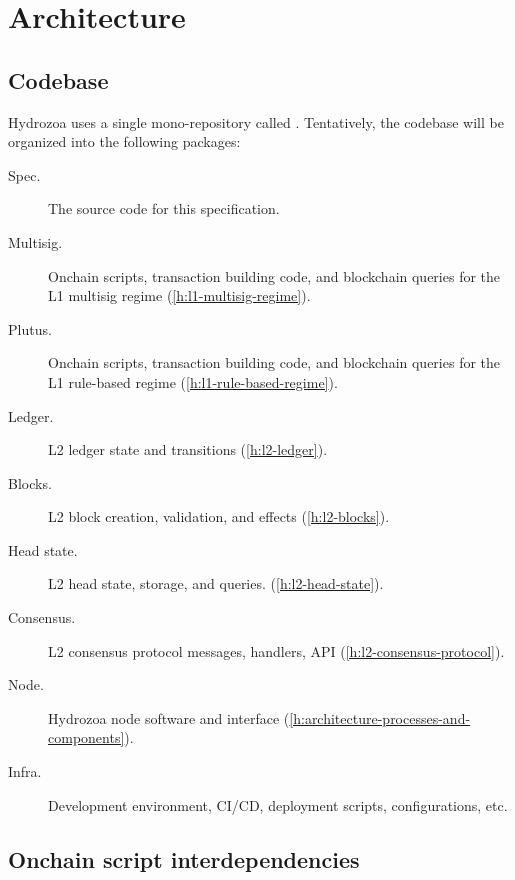 \documentclass[../hydrozoa.tex]{subfiles}
\begin{document}
\chapter{Architecture}%
\label{h:architecture}%


\section{Codebase}%
\label{h:architecture-codebase}%

Hydrozoa uses a single mono-repository called  \citep{FlerovskyRodionovHydrozoaRepositoryGithub2025}.
Tentatively, the codebase will be organized into the following packages:
\begin{description}
  \item[Spec.] The source code for this specification.
  \item[Multisig.] Onchain scripts, transaction building code, and blockchain queries for the L1 multisig regime (\cref{h:l1-multisig-regime}).
  \item[Plutus.] Onchain scripts, transaction building code, and blockchain queries for the L1 rule-based regime (\cref{h:l1-rule-based-regime}).
  \item[Ledger.] L2 ledger state and transitions (\cref{h:l2-ledger}).
  \item[Blocks.] L2 block creation, validation, and effects (\cref{h:l2-blocks}).
  \item[Head state.] L2 head state, storage, and queries. (\cref{h:l2-head-state}).
  \item[Consensus.] L2 consensus protocol messages, handlers, API (\cref{h:l2-consensus-protocol}).
  \item[Node.] Hydrozoa node software and interface (\cref{h:architecture-processes-and-components}).
  \item[Infra.] Development environment, CI/CD, deployment scripts, configurations, etc.
\end{description}

\section{Onchain script interdependencies}%
\label{h:ref}%
\end{document}
